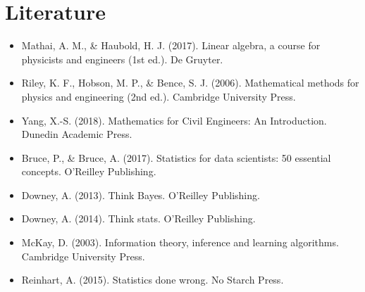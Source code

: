     \section{Literature}
    \begin{itemize}
        \item Mathai, A. M., \& Haubold, H. J. (2017). Linear algebra, a course for physicists and engineers (1st ed.). De Gruyter.
        \item Riley, K. F., Hobson, M. P., \& Bence, S. J. (2006). Mathematical methods for physics and engineering (2nd ed.). Cambridge University Press.
        \item Yang, X.-S. (2018). Mathematics for Civil Engineers: An Introduction. Dunedin Academic Press.
        \item Bruce, P., \& Bruce, A. (2017). Statistics for data scientists: 50 essential concepts. O’Reilley Publishing.
        \item Downey, A. (2013). Think Bayes. O’Reilley Publishing.
        \item Downey, A. (2014). Think stats. O’Reilley Publishing.
        \item McKay, D. (2003). Information theory, inference and learning algorithms. Cambridge University Press.
        \item Reinhart, A. (2015). Statistics done wrong. No Starch Press.
    \end{itemize}
